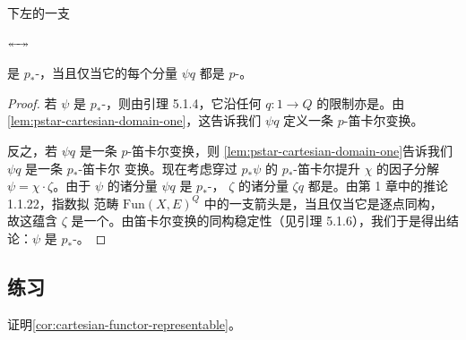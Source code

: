 \begin{lemma}\label{lem:pstar-cartesian-components}
下左的一支\trNaturalTransformation
\begin{center}
\qquad
{}
\quad $\twoheadleftarrow\!\!\twoheadrightarrow$ \quad
{}
\end{center}
是 $p_{*}$-\trCartesian，当且仅当它的每个分量 $\psi q$ 都是 $p$-\trCartesian。
\end{lemma}

\begin{proof}
若 $\psi$ 是 $p_{*}$-\trCartesian，则由引理 5.1.4，它沿任何\trElement{}
$q\colon 1\to Q$ 的限制亦是。由\cref{lem:pstar-cartesian-domain-one}，这告诉我们
$\psi q$ 定义一条 $p$-笛卡尔变换。

反之，若 $\psi q$ 是一条 $p$-笛卡尔变换，则%
\cref{lem:pstar-cartesian-domain-one}告诉我们 $\psi q$ 是一条 $p_{*}$-笛卡尔%
变换。现在考虑穿过 $p_{*}\psi$ 的 $p_{*}$-笛卡尔提升 $\chi$ 的因子分解
$\psi=\chi\cdot\zeta$。由于 $\psi$ 的诸分量 $\psi q$ 是 $p_{*}$-\trCartesian，
$\zeta$ 的诸分量 $\zeta q$ 都是\trIsomorphism。由第 1 章中的推论 1.1.22，指数拟%
范畴 $\mathrm{Fun}(X,E)^{Q}$ 中的一支箭头是\trIsomorphism，当且仅当它是逐点同构，
故这蕴含 $\zeta$ 是一个\trIsomorphism。由笛卡尔变换的同构稳定性（见引理
5.1.6），我们于是得出结论：$\psi$ 是 $p_{*}$-\trCartesian。
\end{proof}


\subsection*{练习}

\begin{exercise}\label{ex:prove-cartesian-functor-representable}
证明\cref{cor:cartesian-functor-representable}。
\end{exercise}

